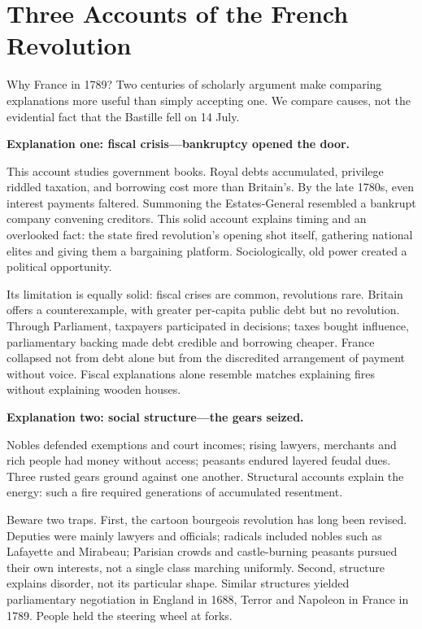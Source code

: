 \section{Three Accounts of the French Revolution}
Why France in 1789? Two centuries of scholarly argument make comparing explanations more useful than simply accepting one. We compare causes, not the evidential fact that the Bastille fell on 14 July.

\textbf{Explanation one: fiscal crisis---bankruptcy opened the door.}

This account studies government books. Royal debts accumulated, privilege riddled taxation, and borrowing cost more than Britain's. By the late 1780s, even interest payments faltered. Summoning the Estates-General resembled a bankrupt company convening creditors. This solid account explains timing and an overlooked fact: the state fired revolution's opening shot itself, gathering national elites and giving them a bargaining platform. Sociologically, old power created a political opportunity.

Its limitation is equally solid: fiscal crises are common, revolutions rare. Britain offers a counterexample, with greater per-capita public debt but no revolution. Through Parliament, taxpayers participated in decisions; taxes bought influence, parliamentary backing made debt credible and borrowing cheaper. France collapsed not from debt alone but from the discredited arrangement of payment without voice. Fiscal explanations alone resemble matches explaining fires without explaining wooden houses.

\textbf{Explanation two: social structure---the gears seized.}

Nobles defended exemptions and court incomes; rising lawyers, merchants and rich people had money without access; peasants endured layered feudal dues. Three rusted gears ground against one another. Structural accounts explain the energy: such a fire required generations of accumulated resentment.

Beware two traps. First, the cartoon bourgeois revolution has long been revised. Deputies were mainly lawyers and officials; radicals included nobles such as Lafayette and Mirabeau; Parisian crowds and castle-burning peasants pursued their own interests, not a single class marching uniformly. Second, structure explains disorder, not its particular shape. Similar structures yielded parliamentary negotiation in England in 1688, Terror and Napoleon in France in 1789. People held the steering wheel at forks.

